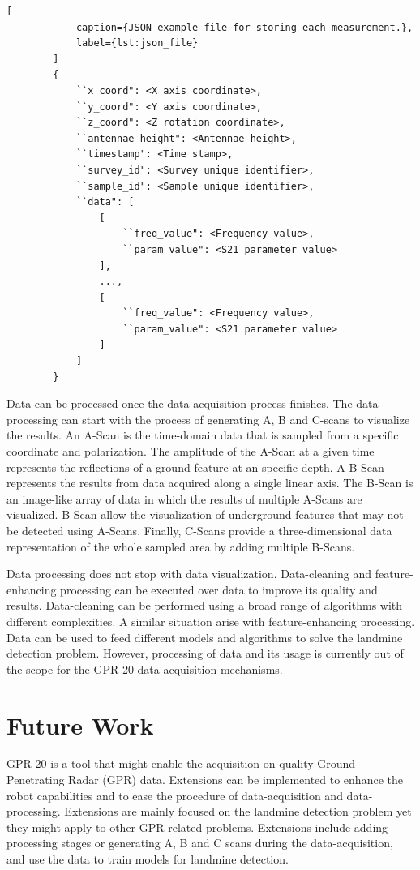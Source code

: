 \documentclass{article}
\begin{document}
\begin{singlespace}
    \begin{lstlisting}[
            caption={JSON example file for storing each measurement.},
            label={lst:json_file}
        ]
        {
            ``x_coord": <X axis coordinate>,
            ``y_coord": <Y axis coordinate>,
            ``z_coord": <Z rotation coordinate>,
            ``antennae_height": <Antennae height>,
            ``timestamp": <Time stamp>,
            ``survey_id": <Survey unique identifier>,
            ``sample_id": <Sample unique identifier>,
            ``data": [
                [
                    ``freq_value": <Frequency value>,
                    ``param_value": <S21 parameter value>
                ],
                ...,
                [
                    ``freq_value": <Frequency value>,
                    ``param_value": <S21 parameter value>
                ]
            ]
        }
    \end{lstlisting}
\end{singlespace}

Data can be processed once the data acquisition process finishes. The data processing can start with the process of generating A, B and C-scans to visualize the results. An A-Scan is the time-domain data that is sampled from a specific coordinate and polarization. The amplitude of the A-Scan at a given time represents the reflections of a ground feature at an specific depth. A B-Scan represents the results from data acquired along a single linear axis. The B-Scan is an image-like array of data in which the results of multiple A-Scans are visualized. B-Scan allow the visualization of underground features that may not be detected using A-Scans. Finally, C-Scans provide a three-dimensional data representation of the whole sampled area by adding multiple B-Scans.

Data processing does not stop with data visualization. Data-cleaning and feature-enhancing processing can be executed over data to improve its quality and results. Data-cleaning can be performed using a broad range of algorithms with different complexities. A similar situation arise with feature-enhancing processing. Data can be used to feed different models and algorithms to solve the landmine detection problem. However, processing of data and its usage is currently out of the scope for the GPR-20 data acquisition mechanisms.

\section{Future Work}
GPR-20 is a tool that might enable the acquisition on quality Ground Penetrating Radar (GPR) data. Extensions can be implemented to enhance the robot capabilities and to ease the procedure of data-acquisition and data-processing. Extensions are mainly focused on the landmine detection problem yet they might apply to other GPR-related problems. Extensions include adding processing stages or generating A, B and C scans during the data-acquisition, and use the data to train models for landmine detection.
\end{document}
